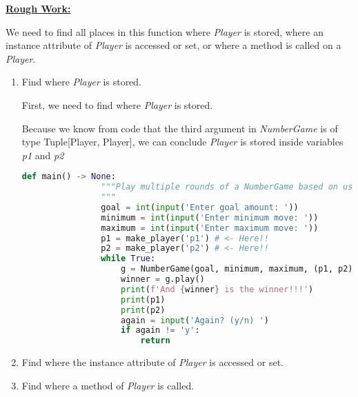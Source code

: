 \documentclass[12pt]{article}
\begin{document}
\begin{enumerate}[1.]
    \bigskip

    \begin{mdframed}
        \underline{\textbf{Rough Work:}}

        \bigskip

        We need to find all places in this function where \textit{Player} is stored,
        where an instance attribute of \textit{Player} is accessed or set, or where
        a method is called on a \textit{Player}.

        \bigskip

        \begin{enumerate}[1.]
            \item Find where \textit{Player} is stored.

            \bigskip

            \begin{mdframed}

            First, we need to find where \textit{Player} is stored.

            \bigskip

            Because we know from code that the third argument in \textit{NumberGame}
            is of type Tuple[Player, Player], we can conclude \textit{Player} is
            stored inside variables \textit{p1} and \textit{p2}

            \begin{lstlisting}[language=Python]
            def main() -> None:
                """Play multiple rounds of a NumberGame based on user input settings.
                """
                goal = int(input('Enter goal amount: '))
                minimum = int(input('Enter minimum move: '))
                maximum = int(input('Enter maximum move: '))
                p1 = make_player('p1') # <- Here!!
                p2 = make_player('p2') # <- Here!!
                while True:
                    g = NumberGame(goal, minimum, maximum, (p1, p2)) # <- Here!!
                    winner = g.play()
                    print(f'And {winner} is the winner!!!')
                    print(p1)
                    print(p2)
                    again = input('Again? (y/n) ')
                    if again != 'y':
                        return
            \end{lstlisting}


            \end{mdframed}

            \item Find where the instance attribute of \textit{Player} is accessed or set.

            \item Find where a method of \textit{Player} is called.

        \end{enumerate}

    \end{mdframed}


\end{enumerate}
\end{document}
